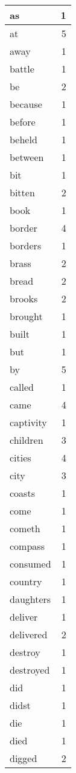 \begin{center}
\begin{longtable}{l|r}
as & 1 \\ \hline
at & 5 \\ \hline
away & 1 \\ \hline
battle & 1 \\ \hline
be & 2 \\ \hline
because & 1 \\ \hline
before & 1 \\ \hline
beheld & 1 \\ \hline
between & 1 \\ \hline
bit & 1 \\ \hline
bitten & 2 \\ \hline
book & 1 \\ \hline
border & 4 \\ \hline
borders & 1 \\ \hline
brass & 2 \\ \hline
bread & 2 \\ \hline
brooks & 2 \\ \hline
brought & 1 \\ \hline
built & 1 \\ \hline
but & 1 \\ \hline
by & 5 \\ \hline
called & 1 \\ \hline
came & 4 \\ \hline
captivity & 1 \\ \hline
children & 3 \\ \hline
cities & 4 \\ \hline
city & 3 \\ \hline
coasts & 1 \\ \hline
come & 1 \\ \hline
cometh & 1 \\ \hline
compass & 1 \\ \hline
consumed & 1 \\ \hline
country & 1 \\ \hline
daughters & 1 \\ \hline
deliver & 1 \\ \hline
delivered & 2 \\ \hline
destroy & 1 \\ \hline
destroyed & 1 \\ \hline
did & 1 \\ \hline
didst & 1 \\ \hline
die & 1 \\ \hline
died & 1 \\ \hline
digged & 2 \\ \hline

\end{longtable}
\end{center}
